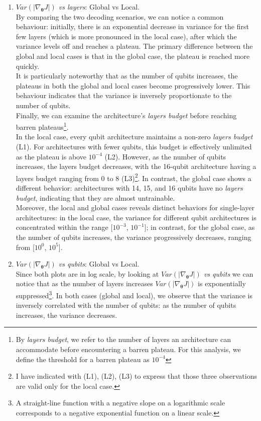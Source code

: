 \begin{enumerate}
    \item \textit{$Var(|\nabla_{\bm{\theta}}J|)$ vs layers}: Global vs Local.\\
    By comparing the two decoding scenarios, we can notice a common behaviour:
    initially, there is an exponential decrease in variance for the first few layers (which is more pronounced 
    in the local case), after which the variance levels off and reaches a plateau.
    The primary difference between the global and local cases is that in the global case, 
    the plateau is reached more quickly.\\
    It is particularly noteworthy that as the number of qubits increases, 
    the plateaus in both the global and local cases become progressively lower.
    This behaviour indicates that the variance is inversely proportionate to the number of qubits.\\
    Finally, we can examine the architecture’s \textit{layers budget} before reaching barren 
    plateaus\footnote[1]{By \textit{layers budget}, we refer to the number of layers an architecture 
    can accommodate before encountering a barren plateau. For this analysis, we define the 
    threshold for a barren plateau as $10^{-4}$}.\\
    In the local case, every qubit architecture maintains 
    a non-zero \textit{layers budget} (L1). For architectures with fewer qubits, this budget is effectively 
    unlimited as the plateau is above $10^{-4}$ (L2). However, as the number of qubits increases, 
    the layers budget decreases, with the 16-qubit architecture having a layers budget ranging from 
    0 to 8 (L3)\footnote[2]{I have indicated with (L1), (L2), (L3) to express that those three 
    observations are valid only for the local case.}. 
    In contrast, the global case shows a different behavior: architectures with 14, 15, and 
    16 qubits have no \textit{layers budget}, indicating that they are almost untrainable.\\
    Moreover, the local and global cases reveals distinct behaviors for single-layer architectures: 
    in the local case, the variance for different qubit architectures is concentrated within the range 
    [$10^{-3}$, $10^{-1}$]; in contrast, for the global case, as the number of qubits increases, 
    the variance progressively decreases, ranging from [$10^0$, $10^5$].

    \item \textit{$Var(|\nabla_{\bm{\theta}}J|)$ vs qubits}: Global vs Local.\\
    Since both plots are in log scale, by looking at 
    \textit{$Var(|\nabla_{\bm{\theta}}J|)$ vs qubits} we can notice that as the number of layers increases 
    $Var(|\nabla_{\bm{\theta}}J|)$ is exponentially suppressed\footnote[1]{A straight-line function 
    with a negative slope on a logarithmic scale corresponds to a negative exponential function 
    on a linear scale.}. 
    In both cases (global and local), we observe that the variance 
    is inversely correlated with the number of qubits: as the number of qubits increases, 
    the variance decreases.
\end{enumerate}

